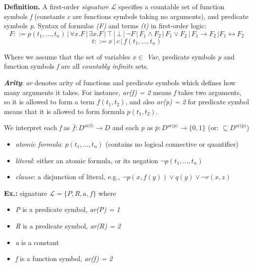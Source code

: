 \documentclass[11pt]{article}
\begin{document}
\begin{tcolorbox}[
    enhanced,
    frame hidden,
    borderline west={2pt}{0pt}{black},
    boxsep=5pt,
    left=8pt
]
\textbf{Definition.} A first-order \textit{signature} $\mathcal{L}$ specifies a countable set of function symbols \textit{f} (constants \textit{c} are functions symbols taking no arguments), and predicate symbols \textit{p}. Syntax of formulas \textit{(F)} and terms \textit{(t)} in first-order logic: $$ F ::= p(t_1, ..., t_n) \, | \, \forall x. F \, | \, \exists x. F \, | \, \top \, | \, \bot \, | \, \neg F \, | \, F_1 \land F_2 \, | \, F_1 \lor F_2 \, | \, F_1 \to F_2 \, | F_1 \leftrightarrow F_2 $$ 
$$t ::= x \, | \, c \, | \, f(t_1, ..., t_n)$$

Where we assume that the set of variables $x \in $ \textit{Var}, predicate symbols \textit{p} and function symbols \textit{f} are all \textit{countably infinite} sets.  
\end{tcolorbox}

\textbf{\textit{Arity}}: \textit{ar} denotes arity of functions and predicate symbols which defines how many arguments it takes. For instance, \textit{ar(f) = 2} means \textit{f} takes two arguments, so it is allowed to form a term $f(t_1, t_2)$, and also \textit{ar(p) = 2} for predicate symbol means that it is allowed to form formula $p(t_1, t_2)$. 

We interpret each \textit{f} as $\bar{f} : D^{\text{ar(f)}} \to D$ and each \textit{p} as $\bar{p} : D^{\text{ar(p)}} \to \{0, 1\}$ (or: $\subseteq D^{\text{ar(p)}}$)
\begin{itemize}
	\item \textit{atomic formula}: $p(t_1, ..., t_n)$ (contains no logical connective or quantifier)
	\item \textit{literal}: either an atomic formula, or its negation $\neg p(t_1, ..., t_n)$ 
	\item \textit{clause}: a disjunction of literal, e.g., $\neg p(x, f(y)) \lor q(y) \lor \neg r(x, z)$
\end{itemize}

\textbf{Ex.:} signature $\mathcal{L} = \{P, R, a, f\}$ where
\begin{itemize}
	\item \textit{P} is a predicate symbol, \textit{ar(P) = 1}
	\item \textit{R} is a predicate symbol, \textit{ar(R) = 2}
	\item \textit{a} is a constant
	\item \textit{f} is a function symbol, \textit{ar(f) = 2}
\end{itemize}
\end{document}

